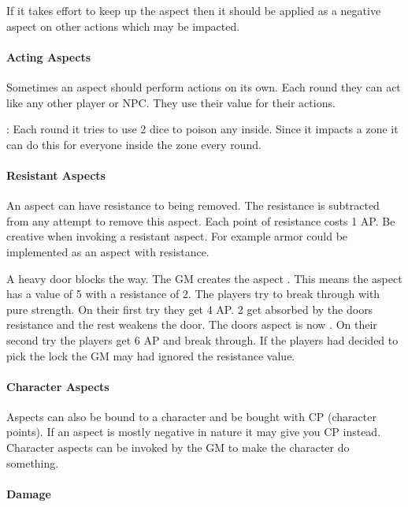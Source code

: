 \documentclass[11pt]{article}
\begin{document}
{If it takes effort to keep up the aspect then it should be applied as a negative aspect on other actions which may be impacted.
\paragraph*{Acting Aspects}
\label{sec:org5ae51a2}

Sometimes an aspect should perform actions on its own. Each round they can act like any other player or NPC. They use their value for their actions.

\begin{pwexample}
: Each round it tries to use 2 dice to poison any inside. Since it impacts a zone it can do this for everyone inside the zone every round.
\end{pwexample}
\paragraph*{Resistant Aspects}
\label{sec:org1ce70b8}
An aspect can have resistance to being removed. The resistance is subtracted from any attempt to remove this aspect. Each point of resistance costs 1 AP. Be creative when invoking a resistant aspect. For example armor could be implemented as an aspect with resistance.

\begin{pwexample}
A heavy door blocks the way. The GM creates the aspect . This means the aspect has a value of 5 with a resistance of 2. The players try to break through with pure strength. On their first try they get 4 AP. 2 get absorbed by the doors resistance and the rest weakens the door. The doors aspect is now . On their second try the players get 6 AP and break through.
If the players had decided to pick the lock the GM may had ignored the resistance value.
\end{pwexample}
\paragraph*{Character Aspects}
\label{sec:orgfa04133}

Aspects can also be bound to a character and be bought with CP (character points). If an aspect is mostly negative in nature it may give you CP instead. Character aspects can be invoked by the GM to make the character do something. 
\paragraph*{Damage}
\label{sec:org9d002cc}

}
\end{document}
